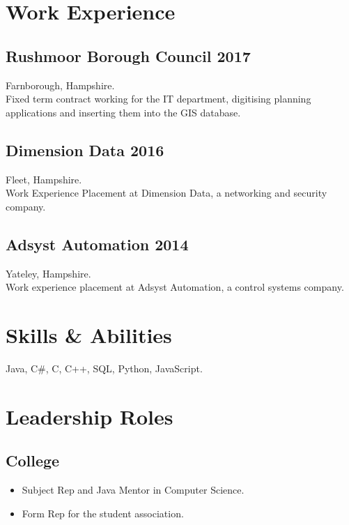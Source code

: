 \documentclass[margin]{res}
\begin{document}
\begin{resume}
\newpage

\section{Work Experience}
\subsection{Rushmoor Borough Council \hfill 2017}
Farnborough, Hampshire.\\
Fixed term contract working for the IT department, digitising planning applications and inserting them into the GIS database.
\subsection{Dimension Data \hfill 2016}
Fleet, Hampshire.\\
Work Experience Placement at Dimension Data, a networking and security company.
\subsection{Adsyst Automation \hfill 2014}
Yateley, Hampshire.\\
Work experience placement at Adsyst Automation, a control systems company.

\vspace{1em}

\section{Skills \& Abilities}
\vspace{2em}
Java, C\#, C, C++, SQL, Python, JavaScript.

\vspace{1em}

\section{Leadership Roles}
\subsection{College}
\begin{itemize}
\item Subject Rep and Java Mentor in Computer Science.
\item Form Rep for the student association.
\end{itemize}

\vspace{1em}


\end{resume}
\end{document}
